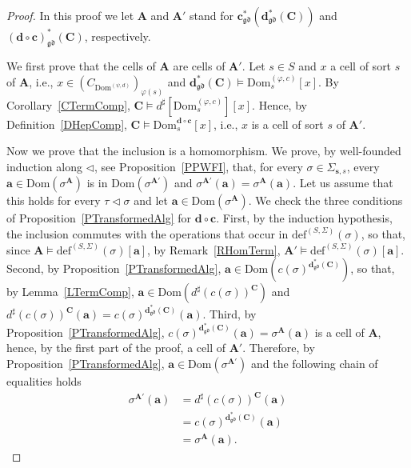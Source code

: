 \documentclass[a4paper, reqno
]{amsart}
\newcommand{\Dom}{\mathrm{Dom}}
\newcommand{\gd}{\mathfrak{gd}}              %
\theoremstyle{plain}
\theoremstyle{definition}
\begin{document}
\begin{proof}
In this proof we let $\mathbf{A}$ and $\mathbf{A}'$ stand for $\mathbf{c}^{\ast}_{\gd}(\mathbf{d}^{\ast}_{\gd}(\mathbf{C}))$ and $(\mathbf{d}\circ\mathbf{c})^{\ast}_{\gd}(\mathbf{C})$, respectively.

We first prove that the cells of $\mathbf{A}$ are cells of $\mathbf{A}'$.
Let $s\in S$ and $x$ a cell of sort $s$ of $\mathbf{A}$, i.e., $x\in(C_{\Dom^{(\psi,d)}})_{\varphi(s)}$ and $\mathbf{d}^{\ast}_{\gd}(\mathbf{C})\models\Dom^{(\varphi,c)}_{s}[x]$.
By Corollary~\ref{CTermComp}, $\mathbf{C}\models d^{\sharp}[\Dom^{(\varphi,c)}_{s}][x]$.
Hence, by Definition~\ref{DHepComp}, $\mathbf{C}\models\Dom^{\mathbf{d}\circ\mathbf{c}}_{s}[x]$, i.e., $x$ is a cell of sort $s$ of $\mathbf{A}'$.

Now we prove that the inclusion is a homomorphism.
We prove, by well-founded induction along $\lhd$, see Proposition~\ref{PPWFI}, that, for every $\sigma\in\Sigma_{\mathbf{s},s}$, every $\mathbf{a}\in\Dom(\sigma^{\mathbf{A}})$ is in $\Dom(\sigma^{\mathbf{A}'})$ and $\sigma^{\mathbf{A}'}(\mathbf{a})=\sigma^{\mathbf{A}}(\mathbf{a})$.
Let us assume that this holds for every $\tau\lhd\sigma$ and let $\mathbf{a}\in\Dom(\sigma^{\mathbf{A}})$.
We check the three conditions of Proposition~\ref{PTransformedAlg} for $\mathbf{d}\circ\mathbf{c}$.
First, by the induction hypothesis, the inclusion commutes with the operations that occur in $\mathrm{def}^{(S,\Sigma)}(\sigma)$, so that, since $\mathbf{A}\models\mathrm{def}^{(S,\Sigma)}(\sigma)[\mathbf{a}]$, by Remark~\ref{RHomTerm}, $\mathbf{A}'\models\mathrm{def}^{(S,\Sigma)}(\sigma)[\mathbf{a}]$.
Second, by Proposition~\ref{PTransformedAlg}, $\mathbf{a}\in\Dom(c(\sigma)^{\mathbf{d}^{\ast}_{\gd}(\mathbf{C})})$, so that, by Lemma~\ref{LTermComp}, $\mathbf{a}\in\Dom(d^{\sharp}(c(\sigma))^{\mathbf{C}})$ and $d^{\sharp}(c(\sigma))^{\mathbf{C}}(\mathbf{a})=c(\sigma)^{\mathbf{d}^{\ast}_{\gd}(\mathbf{C})}(\mathbf{a})$.
Third, by Proposition~\ref{PTransformedAlg}, $c(\sigma)^{\mathbf{d}^{\ast}_{\gd}(\mathbf{C})}(\mathbf{a})=\sigma^{\mathbf{A}}(\mathbf{a})$ is a cell of $\mathbf{A}$, hence, by the first part of the proof, a cell of $\mathbf{A}'$.
Therefore, by Proposition~\ref{PTransformedAlg}, $\mathbf{a}\in\Dom(\sigma^{\mathbf{A}'})$ and the following chain of equalities holds
\begin{align*}
\sigma^{\mathbf{A}'}\left(\mathbf{a}\right)
&=
d^{\sharp}(c(\sigma))^{\mathbf{C}}\left(\mathbf{a}\right)
\tag{1}
\\&=
c(\sigma)^{\mathbf{d}^{\ast}_{\gd}(\mathbf{C})}\left(\mathbf{a}\right)
\tag{2}
\\&=
\sigma^{\mathbf{A}}\left(\mathbf{a}\right).
\tag{3}
\end{align*}


\end{proof}
\end{document}
